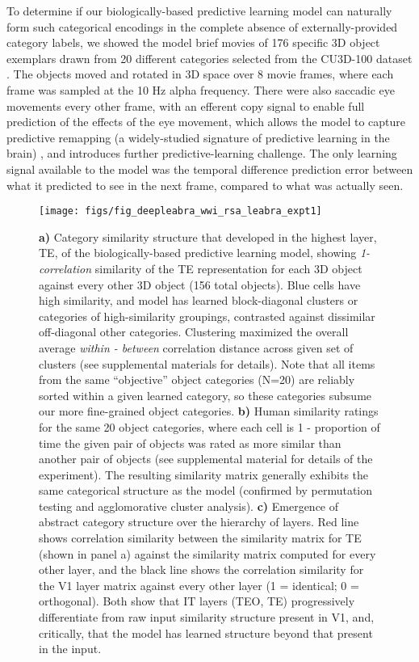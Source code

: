 \documentclass[11pt,twoside]{article}
\newif\myifpdf
\begin{document}
To determine if our biologically-based predictive learning model can naturally form such categorical encodings in the complete absence of externally-provided category labels, we showed the model brief movies of 176 specific 3D object exemplars drawn from 20 different categories selected from the CU3D-100 dataset \cite{OReillyWyatteHerdEtAl13}.  The objects moved and rotated in 3D space over 8 movie frames, where each frame was sampled at the 10 Hz alpha frequency.  There were also saccadic eye movements every other frame, with an efferent copy signal to enable full prediction of the effects of the eye movement, which allows the model to capture predictive remapping (a widely-studied signature of predictive learning in the brain) \cite{DuhamelColbyGoldberg92,CavanaghHuntAfrazEtAl10}, and introduces further predictive-learning challenge.  The only learning signal available to the model was the temporal difference prediction error between what it predicted to see in the next frame, compared to what was actually seen.  

\begin{figure}
  \centering\texttt{[image: figs/fig\_deepleabra\_wwi\_rsa\_leabra\_expt1]}
  \caption{\small {\bf a)} Category similarity structure that developed in the highest layer, TE, of the biologically-based predictive learning model, showing {\em 1-correlation} similarity of the TE representation for each 3D object against every other 3D object (156 total objects). Blue cells have high similarity, and model has learned block-diagonal clusters or categories of high-similarity groupings, contrasted against dissimilar off-diagonal other categories.  Clustering maximized the overall average {\em within - between} correlation distance across given set of clusters (see supplemental materials for details).  Note that all items from the same ``objective'' object categories (N=20) are reliably sorted within a given learned category, so these categories subsume our more fine-grained object categories. {\bf b)} Human similarity ratings for the same 20 object categories, where each cell is 1 - proportion of time the given pair of objects was rated as more similar than another pair of objects (see supplemental material for details of the experiment).  The resulting similarity matrix generally exhibits the same categorical structure as the model (confirmed by permutation testing and agglomorative cluster analysis).  {\bf c)} Emergence of abstract category structure over the hierarchy of layers.  Red line shows correlation similarity between the similarity matrix for TE (shown in panel a) against the similarity matrix computed for every other layer, and the black line shows the correlation similarity for the V1 layer matrix against every other layer (1 = identical; 0 = orthogonal). Both show that IT layers (TEO, TE) progressively differentiate from raw input similarity structure present in V1, and, critically, that the model has learned structure beyond that present in the input.}
  \label{fig.rsa}
\end{figure}
\end{document}

